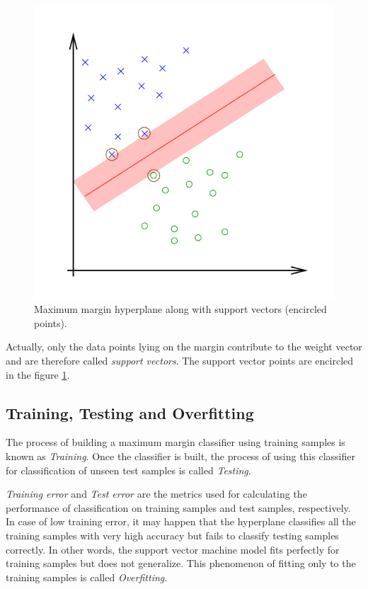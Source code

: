 \begin{figure}
\centering
\includegraphics[scale=0.4]{figures/SVMFigure3.png}
\caption{Maximum margin hyperplane along with support vectors (encircled points).}\label{fig:SVM3}
\end{figure}

Actually, only the data points lying on the margin contribute to the weight vector and are therefore called \textit{support vectors}. The support vector points are encircled in the figure \ref{fig:SVM3}. 

\subsection{Training, Testing and Overfitting}

The process of building a maximum margin classifier using training samples is known as \textit{Training}. Once the classifier is built, the process of using this classifier for classification of unseen test samples is called \textit{Testing}. 

\textit{Training error} and \textit{Test error} are the metrics used for calculating the performance of classification on training samples and test samples, respectively. In case of low training error, it may happen that the hyperplane classifies all the training samples with very high accuracy but fails to classify testing samples correctly. In other words, the support vector machine model fits perfectly for training samples but does not generalize. This phenomenon of fitting only to the training samples is called \textit{Overfitting}.

